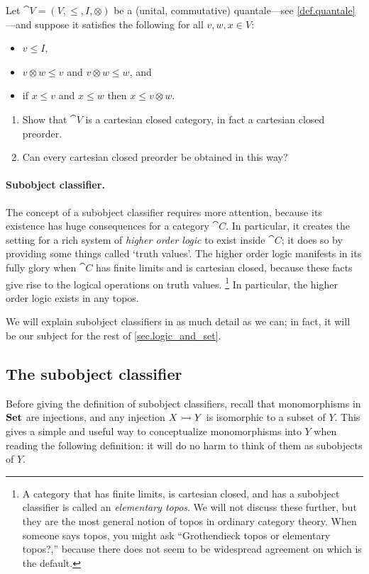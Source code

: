 \documentclass[7Sketches]{subfiles}
\begin{document}
\begin{exercise}%
\label{ex.ccposet_quantale}
Let $\cat{V}=(V,\leq,I,\otimes)$ be a (unital, commutative) quantale---see
\cref{def.quantale}---and suppose it satisfies the following for all $v,w,x\in V$:
\begin{itemize}
	\item $v\leq I$,
	\item $v\otimes w\leq v$ and $v\otimes w\leq w$, and
	\item if $x\leq v$ and $x\leq w$ then $x\leq v\otimes w$.\bigskip
\end{itemize}
\begin{enumerate}
	\item Show that $\cat{V}$ is a cartesian closed category, in fact a cartesian closed preorder.
	\item Can every cartesian closed preorder be obtained in this way?
\qedhere
\end{enumerate}
\end{exercise}

\paragraph{Subobject classifier.}%
The concept of a subobject classifier requires more attention, because its existence has huge consequences for a category $\cat{C}$. In particular, it creates the setting for a rich system of \emph{higher order logic} to exist inside $\cat{C}$; it does so by providing some things called `truth values'. The higher order logic manifests in its fully glory when $\cat{C}$ has finite limits and is cartesian closed, because these facts give rise to the logical operations on truth values.%
\footnote{A category that has finite limits, is cartesian closed, and has a subobject classifier is called an \emph{elementary topos}. We will not discuss these further, but they are the most general notion of topos in ordinary category theory. When someone says topos, you might ask ``Grothendieck topos or elementary topos?,'' because there does not seem to be widespread agreement on which is the default.
}
In particular, the higher order logic exists in any topos.

We will explain subobject classifiers in as much detail as we can; in fact, it will be our subject for the rest of \cref{sec.logic_and_set}.

\subsection{The subobject classifier}%
\label{subsec.subobj_classifier}
Before giving the definition of subobject classifiers, recall that monomorphisms in $\mathbf{Set}$ are injections, and any injection $X\rightarrowtail Y$ is isomorphic to a subset of $Y$. This gives a simple and useful way to conceptualize monomorphisms into $Y$ when reading the following definition: it will do no harm to think of them as subobjects of $Y$.
\end{document}
